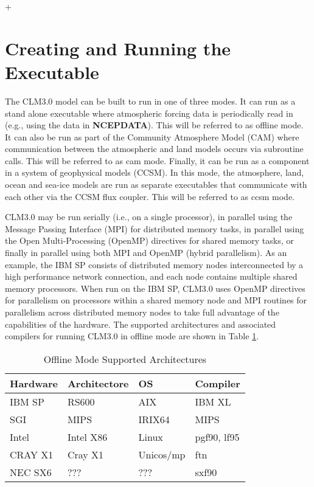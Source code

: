 +\section{Creating and Running the Executable}

The CLM3.0 model can be built to run in one of three modes. It can run
as a stand alone executable where atmospheric forcing data is
periodically read in (e.g., using the data in {\bf NCEPDATA}).  This
will be referred to as offline mode. It can also be run as part of the
Community Atmosphere Model (CAM) where communication between the
atmospheric and land models occurs via subroutine calls. This will be
referred to as cam mode. Finally, it can be run as a component in a
system of geophysical models (CCSM).  In this mode, the atmosphere,
land, ocean and sea-ice models are run as separate executables
that communicate with each other via the CCSM flux coupler. This will
be referred to as ccsm mode.

CLM3.0 may be run serially (i.e., on a single processor), in parallel
using the Message Passing Interface (MPI) for distributed memory
tasks, in parallel using the Open Multi-Processing (OpenMP) directives
for shared memory tasks, or finally in parallel using both MPI and
OpenMP (hybrid parallelism).  As an example, the IBM SP consists of
distributed memory nodes interconnected by a high performance network
connection, and each node contains multiple shared memory processors.
When run on the IBM SP, CLM3.0 uses OpenMP directives for parallelism
on processors within a shared memory node and MPI routines for
parallelism across distributed memory nodes to take full advantage of
the capabilities of the hardware.  The supported architectures and
associated compilers for running CLM3.0 in offline mode are shown in
Table
\ref{table_supported_arch}.

\begin{longtable}{|l|l||l|l|}
\caption{\label{table_supported_arch} Offline Mode Supported Architectures} \\ \hline 
Hardware & Architectore & OS        & Compiler     \\ \hline \hline
IBM SP   & RS600        & AIX       & IBM XL       \\ \hline 
SGI      & MIPS         & IRIX64    & MIPS         \\ \hline  
Intel    & Intel X86    & Linux     & pgf90, lf95  \\ \hline  
CRAY X1  & Cray X1      & Unicos/mp & ftn          \\ \hline 
NEC SX6  & ???          & ???       & sxf90        \\ \hline        
\end{longtable}
\medskip


